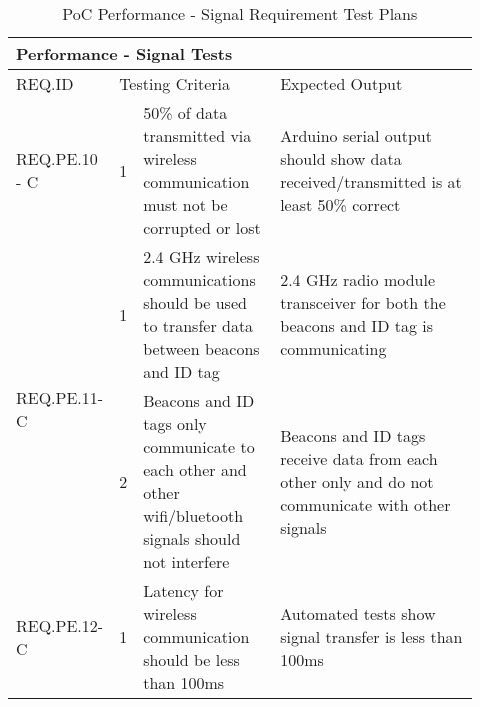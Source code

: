 \begin{table}[h!]
    \centering
    \begin{tabular}{|m{0.15\linewidth}|m{0.02\linewidth}|m{0.3\linewidth}|m{0.45\linewidth}|} 
    \hline
    \multicolumn{4}{|l|}{Performance - Signal Tests }           \\ 
    \hline
    REQ.ID      & \multicolumn{2}{l|}{Testing Criteria}      & Expected Output          \\ 
    \hline
    
    REQ.PE.10 - C                 
    & 1 
    & 50\% of data transmitted via wireless communication must not be corrupted or lost
    & Arduino serial output should show data received/transmitted is at least 50\% correct    \\ 
    \hline    
    
    \multirow{2}{*}{REQ.PE.11-C} 
    & 1 
    & 2.4 GHz wireless communications should be used to transfer data between beacons and ID tag
    & 2.4 GHz radio module transceiver for both the beacons and ID tag is communicating     \\ 
    \cline{2-4}
    & 2 
    & Beacons and ID tags only communicate to each other and other wifi/bluetooth signals should not interfere
    & Beacons and ID tags receive data from each other only and do not communicate with other signals \\
    \hline 
    
    REQ.PE.12-C                  
    & 1 
    & Latency for wireless communication should be less than 100ms
    & Automated tests show signal transfer is less than 100ms    \\ 
    \hline    
\end{tabular}
\caption{PoC Performance - Signal Requirement Test Plans}
\end{table}

%